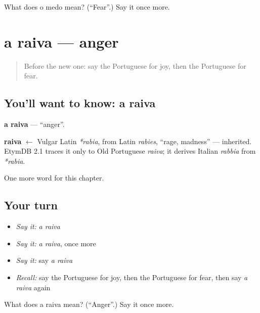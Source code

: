 \begin{tcolorbox}[breakable,colback=teal!4,colframe=teal!35!black,title={Before you move on}]
What does o medo mean? (\textquotedblleft{}Fear\textquotedblright{}.) Say it once more.
\end{tcolorbox}
\section[a raiva]{a raiva — anger}

\label{lesson:PT-C36-raiva}



\begin{quote}
Before the new one: say the Portuguese for joy, then the Portuguese for fear.
\end{quote}

\subsection*{You'll want to know: a raiva}
\textbf{a raiva} — \textquotedblleft{}anger\textquotedblright{}.

\begin{cousinweb}
\textbf{raiva} $\leftarrow$ Vulgar Latin \emph{*rabia}, from Latin \emph{rabies}, \textquotedblleft{}rage, madness\textquotedblright{} — inherited. EtymDB 2.1 traces it only to Old Portuguese \emph{raiva}; it derives Italian \emph{rabbia} from \emph{*rabia}.
\end{cousinweb}

\begin{grammarlens}[title={What you've built}]
One more word for this chapter.
\end{grammarlens}

\subsection*{Your turn}
\begin{itemize}
\raggedright
  \item \emph{Say it:} \emph{a raiva}
  \item \emph{Say it:} \emph{a raiva}, once more
  \item \emph{Say it:} say \emph{a raiva}
  \item \emph{Recall:} say the Portuguese for joy, then the Portuguese for fear, then say \emph{a raiva} again
\end{itemize}

\begin{tcolorbox}[breakable,colback=teal!4,colframe=teal!35!black,title={Before you move on}]
What does a raiva mean? (\textquotedblleft{}Anger\textquotedblright{}.) Say it once more.
\end{tcolorbox}
